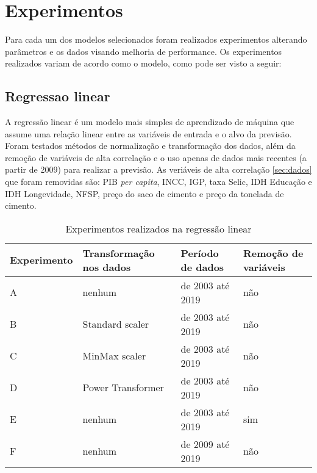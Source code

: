 
\chapter{Experimentos}

Para cada um dos modelos selecionados foram realizados experimentos
alterando parâmetros e os dados visando melhoria de performance. Os experimentos
realizados variam de acordo como o modelo, como pode ser visto a seguir:

\section{Regressao linear}

A regressão linear é um modelo mais simples de aprendizado de máquina que assume
uma relação linear entre as variáveis de entrada e o alvo da previsão. Foram testados
métodos de normalização e transformação dos dados, além da remoção de variáveis de 
alta correlação e o uso apenas de dados mais recentes (a partir de 2009) para 
realizar a previsão. As veriáveis de alta correlação \ref{sec:dados} que foram removidas são: 
PIB \textit{per capita}, INCC, IGP, taxa Selic, IDH Educação e IDH Longevidade, 
NFSP, preço do saco de cimento e preço da tonelada de cimento.

\begin{table}
    \centering
    \begin{tabular}{llll}
        \toprule
        Experimento & Transformação nos dados     & Período de dados & Remoção de variáveis  \\
        \midrule
        A           & nenhum & de 2003 até 2019            & não~                                     \\
        B           & Standard scaler~            & de 2003 até 2019            & não~ ~                                   \\
        C           & MinMax scaler~ ~            & de 2003 até 2019            & não~ ~ ~                                 \\
        D           & Power Transformer           & de 2003 até 2019            & não                                      \\
        E           & nenhum & de 2003 até 2019            & sim                                      \\
        F           & nenhum & de 2009 até 2019            & não                                      \\
        \bottomrule
    \end{tabular}
    \label{tab:exp-reg-lin}
    \caption{Experimentos realizados na regressão linear}
\end{table}

